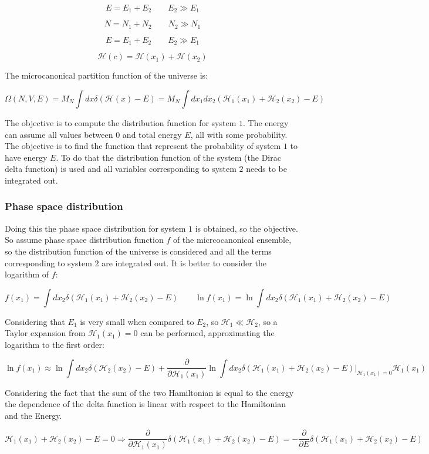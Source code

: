 	$$E = E_1 + E_2\qquad E_2\gg E_1$$

	$$N = N_1 + N_2\qquad N_2\gg N_1$$

	$$E = E_1 + E_2\qquad E_2\gg E_1$$

	$$\mathcal{H}(c) =\mathcal{H}(x_1)+\mathcal{H}(x_2)$$

	The microcanonical partition function of the universe is:

	$$\Omega(N, V, E) = M_N\int dx\delta(\mathcal{H}(x)-E) = M_N\int dx_1dx_2(\mathcal{H}_1(x_1) + \mathcal{H}_2(x_2) - E)$$

	The objective is to compute the distribution function for system $1$.
	The energy can assume all values between $0$ and total energy $E$, all with some probability.
	The objective is to find the function that represent the probability of system $1$ to have energy $E$.
	To do that the distribution function of the system (the Dirac delta function) is used and all variables corresponding to system $2$ needs to be integrated out.

		\subsubsection{Phase space distribution}
		Doing this the phase space distribution for system $1$ is obtained, so the objective.
		So assume phase space distribution function $f$ of the micrcocanonical ensemble, so the distribution function of the universe is considered and all the terms corresponding to system $2$ are integrated out.
		It is better to consider the logarithm of $f$:

		$$f(x_1) = \int dx_2\delta(\mathcal{H}_1(x_1)+\mathcal{H}_2(x_2) -E)\qquad \ln f(x_1) = \ln \int dx_2\delta(\mathcal{H}_1(x_1)+\mathcal{H}_2(x_2) -E)$$

		Considering that $E_1$ is very small when compared to $E_2$, so $\mathcal{H}_1\ll\mathcal{H}_2$, so a Taylor expansion from $\mathcal{H}_1(x_1)=0$ can be performed, approximating the logarithm to the first order:

		$$\ln f(x_1) \approx\ln\int dx_2\delta(\mathcal{H}_2(x_2)-E) + \frac{\partial}{\partial\mathcal{H}_1(x_1)}\ln\int dx_2\delta(\mathcal{H}_1(x_1) + \mathcal{H}_2(x_2) -E)|_{\mathcal{H}_1(x_1)=0}\mathcal{H}_1(x_1)$$

		Considering the fact that the sum of the two Hamiltonian is equal to the energy the dependence of the delta function is linear with respect to the Hamiltonian and the Energy.

		$$\mathcal{H}_1(x_1) + \mathcal{H}_2(x_2) - E = 0\Rightarrow\frac{\partial}{\partial\mathcal{H}_1(x_1)}\delta(\mathcal{H}_1(x_1)+\mathcal{H}_2(x_2)-E) = -\frac{\partial}{\partial E}\delta(\mathcal{H}_1(x_1)+\mathcal{H}_2(x_2)-E)$$

